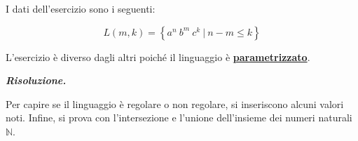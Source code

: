 \documentclass[a4paper]{article}
\begin{document}
	\noindent
	I dati dell'esercizio sono i seguenti:
	
	\begin{equation*}
		L\left(m,k\right) = \left\{a^{n} \: b^{m} \: c^{k} \: \left| \: n-m \le k \right.\right\}
	\end{equation*}\newline

	\noindent
	L'esercizio è diverso dagli altri poiché il linguaggio è \textbf{\underline{parametrizzato}}.\newline
	
	\noindent
	\textcolor{Green4}{\textbf{\emph{Risoluzione.}}}\newline
	
	\noindent
	Per capire se il linguaggio è regolare o non regolare, si inseriscono alcuni valori noti. Infine, si prova con l'intersezione e l'unione dell'insieme dei numeri naturali $\mathbb{N}$.
	
\end{document}
